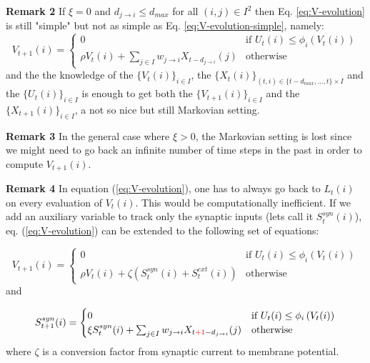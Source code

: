 \documentclass[11pt]{scrartcl}
\begin{document}
\textbf{Remark 2} If \(\xi=0\) and \(d_{j\rightarrow i} \le d_{max}\) for all \((i,j) \in I^2\) then Eq. \ref{eq:V-evolution} is still "simple" but not as simple as Eq. \ref{eq:V-evolution-simple}, namely:
\begin{equation}\label{eq:V-evolution-not-so-simple}
V_{t+1}(i) = \begin{cases}0 & \text{if } U_t(i) \le \phi_i\left(V_t(i)\right) \\ \rho V_{t}(i) + \sum_{j \in I}  w_{ j \to i} X_{t-d_{j\rightarrow i}}(j) & \text{otherwise}   \end{cases}
\end{equation} 
and the the knowledge of the \(\{V_t(i)\}_{i \in I}\), the \(\{X_t(i)\}_{(t,i) \in \{t-d_{max},\ldots,t\} \times I}\) and the \(\{U_t(i)\}_{i \in I}\) is enough to get both the \(\{V_{t+1}(i)\}_{i \in I}\) and the \(\{X_{t+1}(i)\}_{i \in I}\), a not so nice but still  Markovian setting.

\color{gray}
\textbf{Remark 3} In the general case where \(\xi > 0\), the Markovian setting is lost since we might need to go back an infinite number of time steps in the past in order to compute \(V_{t+1}(i)\). 

\textbf{Remark 4}
\color{red}
In equation (\ref{eq:V-evolution}), one has to always go back to \(L_t(i)\) on every evaluation of \(V_t(i)\). This would be computationally inefficient. If we add an auxiliary variable to track only the synaptic inputs (lets call it \(S_t^{syn}(i)\)), eq. (\ref{eq:V-evolution}) can be extended to the following set of equations:

\color{black}
\begin{equation}\label{eq:V-evolution-extended}
V_{t+1}(i) = \begin{cases}0 & \text{if } U_t(i) \le \phi_i\left(V_t(i)\right) \\
\rho V_{t}(i) + \zeta \left(S_t^{syn}(i) + S_t^{ext}(i)\right) & \text{otherwise}   \end{cases}
\end{equation} 
and

\begin{equation}\label{eq:Isyn-evolution-refractory}
S_{t+1}^{syn}(i) = \begin{cases}
0 & \text{if } U_t(i) \le \phi_i\left(V_t(i)\right) \\
\xi S_t^{syn}(i) + \sum_{j \in I}  w_{ j \to i} X_{t{\color{red}+1}-d_{j\rightarrow i}}(j) & \text{otherwise}   \end{cases}
\end{equation} 
where \(\zeta\) is a conversion factor from synaptic current to membrane potential.
\end{document}
